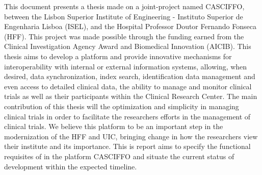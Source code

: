 \abstractEN %
This document presents a thesis made on a joint-project named CASCIFFO, between the Lisbon Superior Institute of Engineering - Instituto Superior de Engenharia Lisboa (ISEL), and the Hospital Professor Doutor Fernando Fonseca (HFF). This project was made possible through the funding earned from the Clinical Investigation Agency Award and Biomedical Innovation (AICIB). 
This thesis aims to develop a platform and provide innovative mechanisms for interoperability with internal or external information systems, allowing, when desired, data synchronization, index search, identification data management and even access to detailed clinical data, the ability to manage and monitor clinical trials as well as their participants within the Clinical Research Center. 
The main contribution of this thesis will the optimization and simplicity in managing clinical trials in order to facilitate the researchers efforts in the management of clinical trials.
We believe this platform to be an important step in the modernization of the HFF and UIC, bringing change in how the researchers view their institute and its importance. 
This is report aims to specify the functional requisites of in the platform CASCIFFO and situate the current status of development within the expected timeline. 






